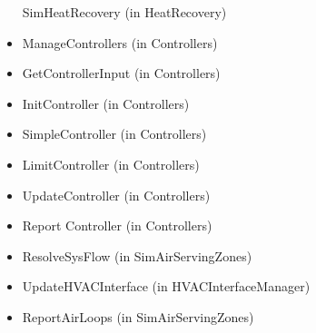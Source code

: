 \begin{itemize}
  SimHeatRecovery (in HeatRecovery)
\item
  ManageControllers (in Controllers)
\item
  GetControllerInput (in Controllers)
\item
  InitController (in Controllers)
\item
  SimpleController (in Controllers)
\item
  LimitController (in Controllers)
\item
  UpdateController (in Controllers)
\item
  Report Controller (in Controllers)
\item
  ResolveSysFlow (in SimAirServingZones)
\item
  UpdateHVACInterface (in HVACInterfaceManager)
\item
  ReportAirLoops (in SimAirServingZones)
\end{itemize}
